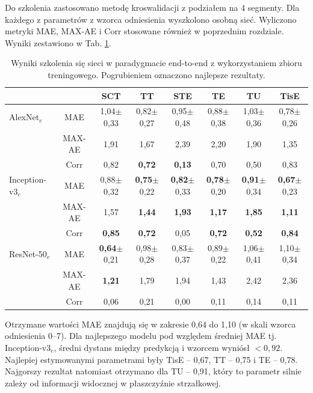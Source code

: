 Do szkolenia zastosowano metodę kroswalidacji z podziałem na 4 segmenty. Dla każdego z parametrów z wzorca odniesienia wyszkolono osobną sieć. Wyliczono metryki MAE, MAX-AE i Corr stosowane również w poprzednim rozdziale. Wyniki zestawiono w Tab. \ref{tab:end-to-endTrain}.
\renewcommand{\arraystretch}{1.2}
\begin{table}[ht]
\scriptsize
\setlength{\tabcolsep}{1pt}
\centering
\caption{Wyniki szkolenia się sieci w paradygmacie end-to-end z wykorzystaniem zbioru treningowego. Pogrubieniem oznaczono najlepsze rezultaty.}
\label{tab:end-to-endTrain}
\begin{tabular}{lc||c|c|c|c|c|c}
	&& \textbf{SCT} & \textbf{TT} & \textbf{STE} & \textbf{TE} & \textbf{TU} & \textbf{TisE}\\ \hline \hline
	AlexNet$_{e}$ & MAE & 1,04$\pm$0,33 & 0,82$\pm$0,27 & 0,95$\pm$0,48 & 0,88$\pm$0,38 & 1,03$\pm$0,36 & 0,78$\pm$0,26  \\
	&MAX-AE & 1,91 & 1,67 & 2,39 & 2,20 & 1,90 & 1,35\\ 
	&Corr & 0,82 & \textbf{0,72} & \textbf{0,13} & 0,70 & 0,50 & 0,83 \\ \hline
	Inception-v3$_{e}$ & MAE & 0,88$\pm$0,32 & \textbf{0,75}$\pm$0,22 & \textbf{0,82}$\pm$0,33 & \textbf{0,78}$\pm$0,20 & \textbf{0,91}$\pm$0,34 & \textbf{0,67}$\pm$0,23 \\
	&MAX-AE & 1,57 & \textbf{1,44} & \textbf{1,93} & \textbf{1,17} & \textbf{1,85} & \textbf{1,11} \\ 
	&Corr & \textbf{0,85} & \textbf{0,72} & 0,05 & \textbf{0,72} & \textbf{0,52} & \textbf{0,84} \\ \hline
	ResNet-50$_{e}$ & MAE & \textbf{0,64}$\pm$0,21 & 0,98$\pm$0,28 & 0,83$\pm$0,37 & 0,89$\pm$0,22 & 1,06$\pm$0,41 & 1,10$\pm$0,34  \\
	&MAX-AE & \textbf{1,21} & 1,79 & 1,94 & 1,43 & 2,42 & 2,36\\
	&Corr & 0,06 & 0,21 & 0,00 & 0,11 & 0,14 & 0,11\\
	
	
\end{tabular}
\end{table}
\renewcommand{\arraystretch}{1}

Otrzymane wartości MAE znajdują się w zakresie 0,64 do 1,10 (w skali wzorca odniesienia 0--7). Dla najlepszego modelu pod względem średniej MAE tj. Inception-v3$_{e}$, średni dystans między predykcją i wzorcem wyniósł $<0,92$. Najlepiej estymowanymi parametrami były TisE -- 0,67, TT -- 0,75 i TE -- 0,78. Najgorszy rezultat natomiast otrzymano dla TU -- 0,91, który to parametr silnie zależy od informacji widocznej w płaszczyźnie strzałkowej.

